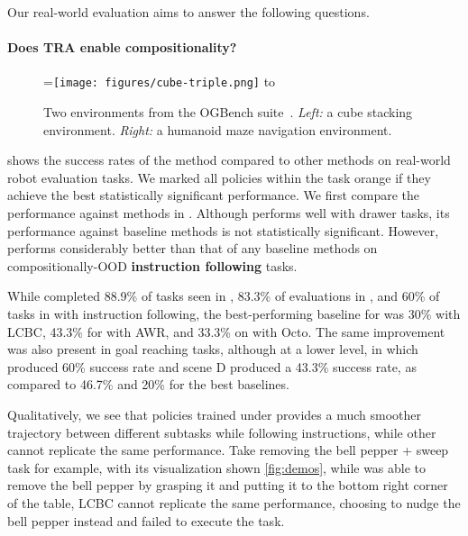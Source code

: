 Our real-world evaluation aims to answer the following questions.

\paragraph{Does TRA enable compositionality?}

\begin{figure}[htb]
    \centering
    =\hbox{\texttt{[image: figures/cube-triple.png]}}
    \hbox to 
    \caption{Two environments from the OGBench suite~\citep{park2025ogbench}.
        \emph{Left:} a cube stacking environment.
        \emph{Right:} a humanoid maze navigation environment.}
    \label{fig:ogbench_envs}
\end{figure}

 shows the success rates of the \Method{} method compared to other methods on real-world robot evaluation tasks.
We marked all policies within the task orange if they achieve the best statistically significant performance.
We first compare the performance against methods in .
Although \Method{} performs well with drawer tasks, its performance against baseline methods is not statistically significant.
However, \Method{} performs considerably better than that of any baseline methods on compositionally-OOD \textbf{instruction following} tasks.

While \Method{} completed 88.9\% of tasks seen in , 83.3\% of evaluations in , and 60\% of tasks in  with instruction following, the best-performing baseline for  was 30\% with LCBC, 43.3\% for  with AWR, and 33.3\% on  with Octo. The same improvement was also present in goal reaching tasks, although at a lower level, in which  produced 60\% success rate and scene D produced a 43.3\% success rate, as compared to 46.7\% and 20\% for the best baselines.

Qualitatively, we see that policies trained under \Method{} provides a much smoother trajectory between different subtasks while following instructions, while other cannot replicate the same performance.
Take removing the bell pepper + sweep task for example, with its visualization shown \cref{fig:demos}, while \Method{} was able to remove the bell pepper by grasping it and putting it to the bottom right corner of the table, LCBC cannot replicate the same performance, choosing to nudge the bell pepper instead and failed to execute the task.

